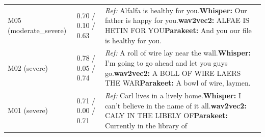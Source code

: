 \begin{table}[t]
\begin{tabular}{@{}p{}p{}p{}@{}}
\addlinespace
M05 (moderate_severe) & 0.70 / 0.10 / 0.63 & \textit{Ref:} Alfalfa is healthy for you.\newline \textbf{Whisper:} Our father is happy for you.\newline \textbf{wav2vec2:} ALFAE IS HETIN FOR YOU\newline \textbf{Parakeet:} And you our file is healthy for you. \\
\addlinespace
M02 (severe) & 0.78 / 0.05 / 0.74 & \textit{Ref:} A roll of wire lay near the wall.\newline \textbf{Whisper:} I'm going to go ahead and let you guys go.\newline \textbf{wav2vec2:} A BOLL OF WIRE LAERS THE WAR\newline \textbf{Parakeet:} A bowl of wire, laymen. \\
\addlinespace
M01 (severe) & 0.71 / 0.00 / 0.71 & \textit{Ref:} Carl lives in a lively home.\newline \textbf{Whisper:} I can't believe in the name of it all.\newline \textbf{wav2vec2:} CALY IN THE LIBELY OF\newline \textbf{Parakeet:} Currently in the library of \\
\bottomrule
\end{tabular}
\end{table}
